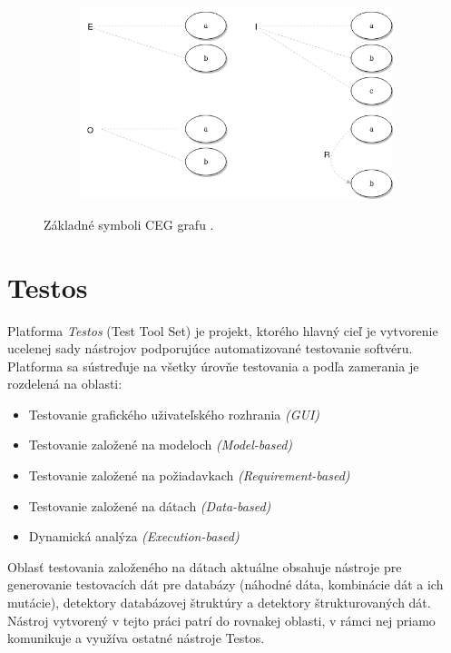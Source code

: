  \begin{figure}[h]\centering
 	\centering
 	\includegraphics[width=4.5in,height=2.2in]{obrazky-figures/ceg_cons.png}\\[1pt]
 	\caption{Základné symboli CEG grafu \cite{Ast}.}
 	\label{ceg_cons_img}
 \end{figure} 
      
\section{Testos}
Platforma \textit{Testos} (Test Tool Set) \cite{Testos} je projekt, ktorého hlavný cieľ je vytvorenie ucelenej sady nástrojov podporujúce automatizované testovanie softvéru. Platforma sa sústreďuje na všetky úrovňe testovania a podľa zamerania je rozdelená na oblasti:
\begin{itemize}
 	\item{Testovanie grafického uživateľského rozhrania \textit{(GUI)}
 	}
 	\item{Testovanie založené na modeloch \textit{(Model-based)}
 	}
 	\item{Testovanie založené na požiadavkach \textit{(Requirement-based)}
 	} 	
 	\item{Testovanie založené na dátach \textit{(Data-based)}
 	} 	
 	\item{Dynamická analýza \textit{(Execution-based)}
 	} 	
\end{itemize}  
Oblasť testovania založeného na dátach aktuálne obsahuje nástroje pre generovanie testovacích dát pre databázy (náhodné dáta, kombinácie dát a ich mutácie), detektory databázovej štruktúry a detektory štrukturovaných dát. Nástroj vytvorený v tejto práci patrí do rovnakej oblasti, v rámci nej priamo komunikuje a využíva ostatné nástroje Testos.

